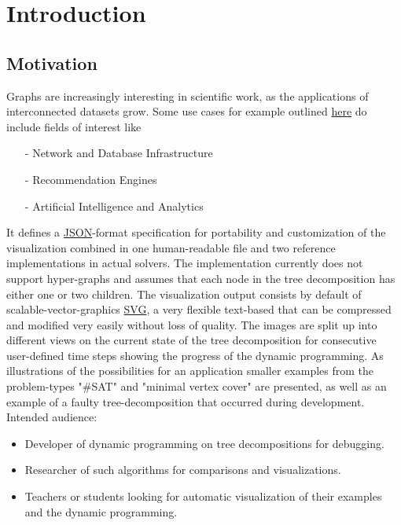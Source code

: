 \documentclass[a4paper, 12pt]{scrartcl}
\begin{document}
\newpage

\tableofcontents

\newpage


\section{Introduction}
\subsection{Motivation}
Graphs are increasingly interesting in scientific work, as the applications of interconnected datasets grow.
Some use cases for example outlined \href{http://neo4j.com/use-cases}{here} do include fields of interest like
\begin{itemize}
	\item[-] Network and Database Infrastructure
	\item[-] Recommendation Engines
	\item[-] Artificial Intelligence and Analytics
\end{itemize}
It defines a \href{https://www.json.org/json-en.html}{JSON}-format specification for portability and customization of the visualization combined in one human-readable file and two reference implementations in actual solvers.
The implementation currently does not support hyper-graphs and assumes that each node in the tree decomposition has either one or two children.
The visualization output consists by default of scalable-vector-graphics \href{https://developer.mozilla.org/en-US/docs/Web/SVG}{SVG}, a very flexible text-based that can be compressed and modified very easily without loss of quality.
The images are split up into different views on the current state of the tree decomposition for consecutive user-defined time steps showing the progress of the dynamic programming.
As illustrations of the possibilities for an application smaller examples from the problem-types "\#SAT" and "minimal vertex cover" are presented,
as well as an example of a faulty tree-decomposition that occurred during development.
Intended audience: 
\begin{itemize}
	\item Developer of dynamic programming on tree decompositions for debugging.
	\item Researcher of such algorithms for comparisons and visualizations.
	\item Teachers or students looking for automatic visualization of their examples and the dynamic programming.
\end{itemize} 
\end{document}
